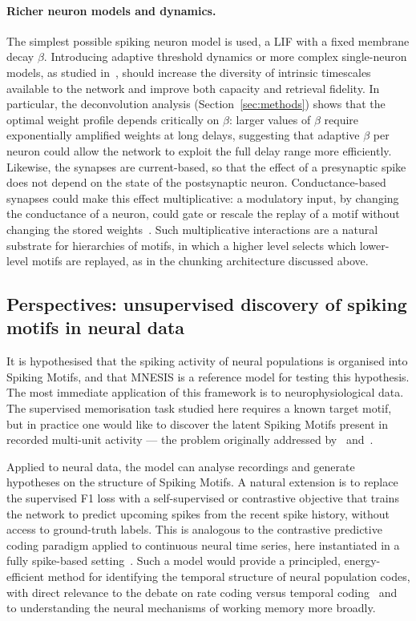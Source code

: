 \documentclass{scrartcl}
\newcommand{\citep}[1]{\parencite{#1}}
\newcommand{\citet}[1]{\textcite{#1}}
\begin{document}
\paragraph{Richer neuron models and dynamics.}
The simplest possible spiking neuron model is used, a LIF with a fixed membrane decay $\beta$. Introducing adaptive threshold dynamics or more complex single-neuron models, as studied in~\citet{Szatmary2010}, should increase the diversity of intrinsic timescales available to the network and improve both capacity and retrieval fidelity. In particular, the deconvolution analysis (Section~\ref{sec:methods}) shows that the optimal weight profile depends critically on $\beta$: larger values of $\beta$ require exponentially amplified weights at long delays, suggesting that adaptive $\beta$ per neuron could allow the network to exploit the full delay range more efficiently. Likewise, the synapses are current-based, so that the effect of a presynaptic spike does not depend on the state of the postsynaptic neuron. Conductance-based synapses could make this effect multiplicative: a modulatory input, by changing the conductance of a neuron, could gate or rescale the replay of a motif without changing the stored weights~\citep{Boutin2020}. Such multiplicative interactions are a natural substrate for hierarchies of motifs, in which a higher level selects which lower-level motifs are replayed, as in the chunking architecture discussed above.

\subsection{Perspectives: unsupervised discovery of spiking motifs in neural data}
It is hypothesised that the spiking activity of neural populations is organised into Spiking Motifs, and that MNESIS is a reference model for testing this hypothesis. The most immediate application of this framework is to neurophysiological data. The supervised memorisation task studied here requires a known target motif, but in practice one would like to discover the latent Spiking Motifs present in recorded multi-unit activity --- the problem originally addressed by~\citet{Ikegaya2004} and~\citet{Villette2015}.



Applied to neural data, the model can analyse recordings and generate hypotheses on the structure of Spiking Motifs. A natural extension is to replace the supervised F1 loss with a self-supervised or contrastive objective that trains the network to predict upcoming spikes from the recent spike history, without access to ground-truth labels. This is analogous to the contrastive predictive coding paradigm applied to continuous neural time series, here instantiated in a fully spike-based setting~\citep{Grimaldi2023}. Such a model would provide a principled, energy-efficient method for identifying the temporal structure of neural population codes, with direct relevance to the debate on rate coding versus temporal coding~\citep{Softky1993,Bohte2004} and to understanding the neural mechanisms of working memory more broadly.
\end{document}
